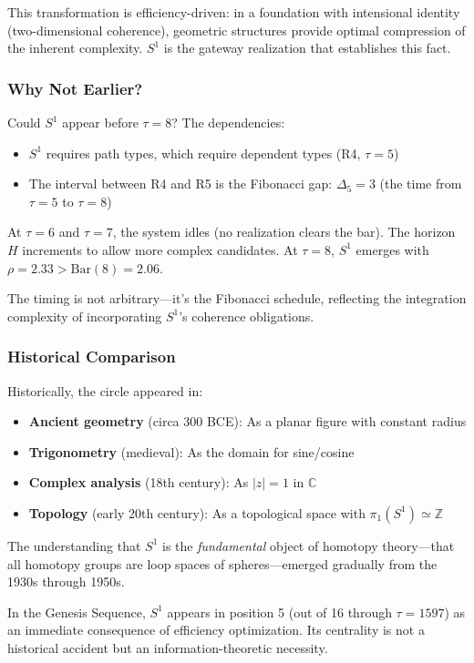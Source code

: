 \documentclass[11pt]{article}
\theoremstyle{definition}
\begin{document}
This transformation is efficiency-driven: in a foundation with intensional identity (two-dimensional coherence), geometric structures provide optimal compression of the inherent complexity. $S^1$ is the gateway realization that establishes this fact.

\subsubsection{Why Not Earlier?}

Could $S^1$ appear before $\tau=8$? The dependencies:
\begin{itemize}
\item $S^1$ requires path types, which require dependent types (R4, $\tau=5$)
\item The interval between R4 and R5 is the Fibonacci gap: $\Delta_5 = 3$ (the time from $\tau=5$ to $\tau=8$)
\end{itemize}

At $\tau=6$ and $\tau=7$, the system idles (no realization clears the bar). The horizon $H$ increments to allow more complex candidates. At $\tau=8$, $S^1$ emerges with $\rho=2.33 > \text{Bar}(8)=2.06$.

The timing is not arbitrary—it's the Fibonacci schedule, reflecting the integration complexity of incorporating $S^1$'s coherence obligations.

\subsubsection{Historical Comparison}

Historically, the circle appeared in:
\begin{itemize}
\item \textbf{Ancient geometry} (circa 300 BCE): As a planar figure with constant radius
\item \textbf{Trigonometry} (medieval): As the domain for sine/cosine
\item \textbf{Complex analysis} (18th century): As $|z|=1$ in $\mathbb{C}$
\item \textbf{Topology} (early 20th century): As a topological space with $\pi_1(S^1) \simeq \mathbb{Z}$
\end{itemize}

The understanding that $S^1$ is the \emph{fundamental} object of homotopy theory—that all homotopy groups are loop spaces of spheres—emerged gradually from the 1930s through 1950s.

In the Genesis Sequence, $S^1$ appears in position 5 (out of 16 through $\tau=1597$) as an immediate consequence of efficiency optimization. Its centrality is not a historical accident but an information-theoretic necessity.
\end{document}
